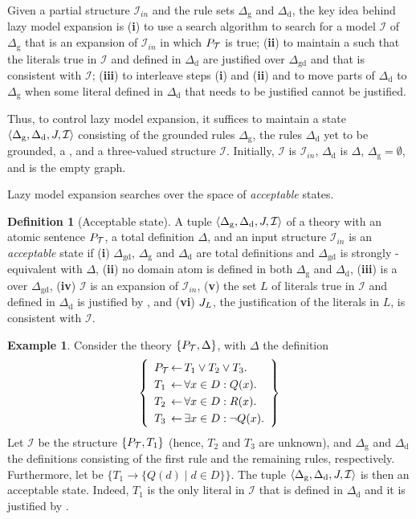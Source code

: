 \documentclass[11pt]{article}
\makeatletter
\newcommand{\m}[1]{\ensuremath{#1}\xspace}
\newcommand{\I}{\m{\mathcal{I}}}
\newcommand{\Iin}{\m{\I_{in}}}
\newcommand{\theory}{\m{\mathcal{T}}}
\newcommand{\D}{\m{\Delta}}
\newcommand{\tuple}[1]{\m{\left \langle #1 \right \rangle }}
\newenvironment{ldef}{\renewcommand\arraystretch{1.25}\left\{\begin{array}{l@{ \,}l@{\,}l}}{\end{array}\right\}}
\newenvironment{ltheo}{\[\begin{array}{l}}{\end{array}\]\ignorespacesafterend}
\theoremstyle{plain}
\theoremstyle{definition}
\newtheorem{definition}[thm]{Definition}
\theoremstyle{example_basic}
\newtheorem{example}[thm]{Example}
\theoremstyle{example_contd}
\theoremstyle{plain}
\newcommand{\Dg}{\ensuremath{\D_\text{g}}\xspace}
\newcommand{\Dd}{\ensuremath{\D_\text{d}}\xspace}
\newcommand{\Dgd}{\ensuremath{\D_\text{gd}}\xspace}
\newcommand{\pt}{\ensuremath{P_\text{\theory}}\xspace}
\newcommand{\tbf}[1]{\textbf{#1}}
\newcommand{\change}[1]{#1}
\makeatother
\begin{document}
Given a partial structure \Iin and the rule sets \Dg and \Dd, the
key idea behind lazy model expansion is
(\tbf{i}) to use a search algorithm to search for a model \I of \Dg that is an expansion of \Iin in which \pt is true; 
(\tbf{ii}) to maintain a \justification \jgraph such that the
literals true in \I and defined in \Dd are justified over \Dgd and
that \jgraph is consistent with \I;
(\tbf{iii}) to interleave steps (\tbf{i}) and (\tbf{ii}) and to move parts of \Dd to \Dg when some literal defined in \Dd that needs to be justified cannot be justified.
 
Thus, to control lazy model expansion, it suffices to maintain a state $\tuple{\Dg,\Dd,\jgraph,\I}$ consisting of the grounded rules \Dg, the rules \Dd yet to be grounded, a \justification \jgraph, and a three-valued structure \I. Initially, $\I$ is $\Iin$, $\Dd$ is $\D$, $\Dg=\emptyset$, and \jgraph is the empty graph.

Lazy model expansion searches over the space of \emph{acceptable} states.

\begin{definition}[Acceptable state]\label{def:acc_state} 
A tuple $\tuple{\Dg,\Dd,\jgraph,\I}$ of a theory with an atomic sentence \pt, a total definition \D, and an input structure \Iin is an \emph{acceptable} state if
(\tbf{i}) \Dgd, \Dg and \Dd are total definitions and \Dgd is strongly \vocf{\D}-equivalent with \D, 
(\tbf{ii}) no domain atom is defined in both \Dg and \Dd, 
(\tbf{iii}) \jgraph is a \justification over \Dgd,
(\tbf{iv}) \I is an expansion of \Iin,
(\tbf{v}) the set $L$  of literals true in \I and defined in \Dd is justified by \jgraph, and
(\tbf{vi}) $J_L$, \change{the justification of the literals in $L$,} is consistent with \I.
\end{definition}

\begin{example}\label{ex:cons}
Consider the theory $\{\pt, \D\}$, with \D the definition
\begin{ltheo}
\begin{ldef}
\LRule{\pt}{ T_1 \lor T_2 \lor T_3} \\
\LRule{T_1}{ \forall x \in D: Q(x) } \\
\LRule{T_2}{ \forall x \in D: R(x) } \\
\LRule{T_3}{ \exists x \in D: \lnot Q(x) } \\
\end{ldef}
\end{ltheo}
Let \I be the structure $\{\pt, T_1\}$ (hence, $T_2$ and $T_3$ are
unknown), and \Dg and \Dd the definitions consisting of the first rule
and the remaining rules, respectively.  Furthermore, let \jgraph be $\{T_1 \rightarrow \{Q(d) \mid d \in D\}\}$. The tuple $\tuple{\Dg, \Dd, \jgraph, \I}$ is then an acceptable state. Indeed, $T_1$ is the only literal in \I that
is defined in \Dd and it is justified by \jgraph.
\end{example}
\end{document}
